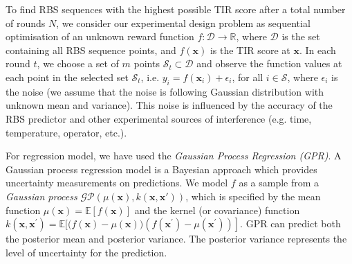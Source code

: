 To find RBS sequences with the highest possible TIR score after a total number of rounds $N$,  we consider our experimental design problem as sequential optimisation of an unknown reward function $f: \mathcal{D} \rightarrow \mathbb{R}$, where $\mathcal{D}$ is the set containing all RBS sequence points, and $f(\mathbf{x})$ is the TIR score at $\mathbf{x}$. 
In each round $t$, we choose a set of $m$ points $\mathcal{S}_t \subset \mathcal{D}$ and observe the function values at each point in the selected set $\mathcal{S}_t$, i.e. $y_i = f(\mathbf{x}_i) + \epsilon_i$, for all $i \in \mathcal{S}$, where $\epsilon_i$ is the noise (we assume that the noise is following Gaussian distribution with unknown mean and variance). This noise is influenced by the accuracy of the RBS predictor and other experimental sources of interference (e.g. time, temperature, operator, etc.). 

For regression model, we have used the \textit{Gaussian Process Regression (GPR)}.
A Gaussian process regression model \cite{Rasmussen2004} is a Bayesian approach which provides uncertainty measurements on predictions. 
We model $f$ as a sample from a \textit{Gaussian process} $\mathcal{G} \mathcal{P}(\mu(\mathbf{x}), k(\mathbf{x}, \mathbf{x'}))$, which is specified by the mean function $\mu(\mathbf{x})=\mathbb{E}[f(\mathbf{x})]$ and the kernel (or covariance) function $k\left(\mathbf{x}, \mathbf{x}^{\prime}\right)=\mathbb{E}[(f(\mathbf{x})-\left.\mu(\mathbf{x}))\left(f\left(\mathbf{x}^{\prime}\right)-\mu\left(\mathbf{x}^{\prime}\right)\right)\right]$.
GPR can predict both the posterior mean and posterior variance. The posterior variance represents the level of uncertainty for the prediction. 


